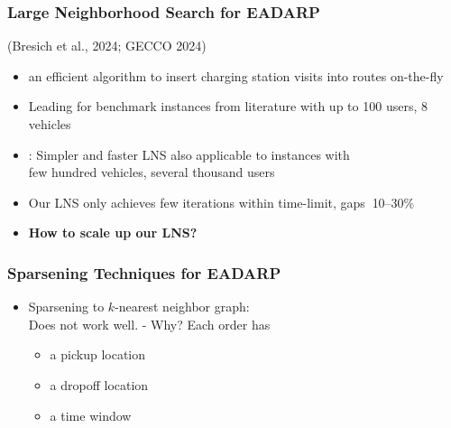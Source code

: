 \documentclass[aspectratio=1610]{beamer}
\newcommand{\important}[1]{{\color{green!60!black}#1}}
\begin{document}
\begin{frame}
	\frametitle{Large Neighborhood Search for EADARP}

	(Bresich et al., 2024; GECCO 2024)

	\bigskip
	\begin{itemize}
		\itemsep3ex
		\item {} an efficient algorithm to insert charging station visits into routes on-the-fly
		\item \important{Leading} for benchmark instances from literature with up to \important{100 users, 8 vehicles}
	\end{itemize}

	\bigskip

	\bigskip
	\begin{itemize}
		\itemsep3ex
		\item<2> \citet{Limmer:2023}: Simpler and faster LNS also applicable to instances with\\
		\important{few hundred vehicles, several thousand users}
		\item<2> Our LNS only achieves \alert{few iterations within time-limit, gaps $~$10--30\%} 
		\item<2> \important{\bf How to scale up our LNS?}
	\end{itemize}

\end{frame}

\begin{frame}
	\frametitle{Sparsening Techniques for EADARP}

	\begin{itemize}
		\item \important{Sparsening to $k$-nearest neighbor graph:}\\
			\alert{Does not work well.} - Why? Each order has
		\begin{itemize}
			\item a pickup location
			\item a dropoff location
			\item a time window
		\end{itemize}
	\end{itemize}

	

\end{frame}

\end{document}
